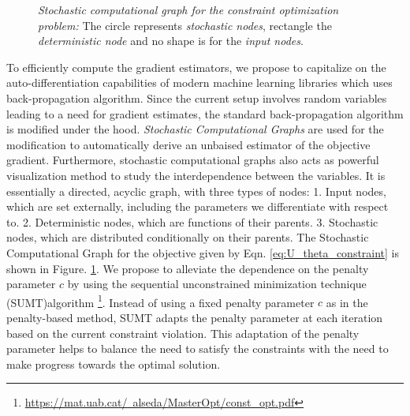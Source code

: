 \begin{itemize}
\begin{figure}
\centering
{}
\caption{\emph{Stochastic computational graph for the constraint optimization problem:} The circle represents \textit{stochastic nodes}, rectangle the \textit{deterministic node} and no shape is for the \textit{input nodes}. }
\label{fig:stochastic graph}
\end{figure}
To efficiently compute the gradient estimators, we propose to capitalize on the auto-differentiation capabilities of modern machine learning libraries which uses back-propagation algorithm. Since the current setup involves random variables leading to a need for gradient estimates, the standard back-propagation algorithm is modified under the hood. \textit{Stochastic Computational Graphs} \cite{schulman_gradient_2016} are used for the modification to automatically derive an unbaised estimator of the objective gradient. Furthermore, stochastic computational graphs also acts as powerful visualization method to study the interdependence between the variables. It is essentially a directed, acyclic graph, with three types of nodes: 1. Input nodes, which are set externally, including the parameters we differentiate with respect to. 2. Deterministic nodes, which are functions of their parents. 3. Stochastic nodes, which are distributed conditionally on their parents. The Stochastic Computational Graph for the objective given by Eqn. \ref{eq:U_theta_constraint} is shown in Figure. \ref{fig:stochastic graph}.
%
We propose to alleviate the dependence on the penalty parameter $c$ by using the sequential unconstrained minimization technique (SUMT)algorithm \cite{fiacco1990nonlinear}\footnote{\href{https://mat.uab.cat/~alseda/MasterOpt/const_opt.pdf}{https://mat.uab.cat/~alseda/MasterOpt/const\_opt.pdf}}. Instead of using a fixed penalty parameter $c$ as in the penalty-based method, SUMT adapts the penalty parameter at each iteration based on the current constraint violation. This adaptation of the penalty parameter helps to balance the need to satisfy the constraints with the need to make progress towards the optimal solution. 


\end{itemize}
